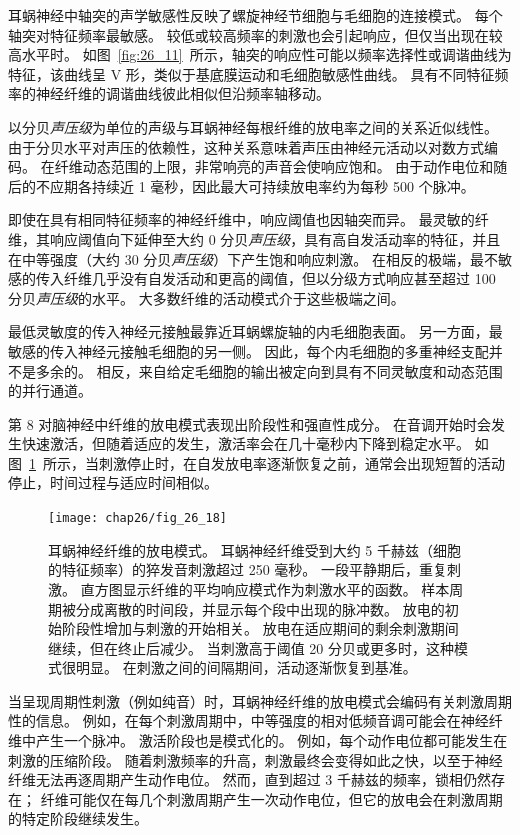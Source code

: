 耳蜗神经中轴突的声学敏感性反映了螺旋神经节细胞与毛细胞的连接模式。
每个轴突对特征频率最敏感。
较低或较高频率的刺激也会引起响应，但仅当出现在较高水平时。
如图~\ref{fig:26_11}~所示，轴突的响应性可能以频率选择性或调谐曲线为特征，该曲线呈 V 形，类似于基底膜运动和毛细胞敏感性曲线。
具有不同特征频率的神经纤维的调谐曲线彼此相似但沿频率轴移动。


以分贝\textit{声压级}为单位的声级与耳蜗神经每根纤维的放电率之间的关系近似线性。
由于分贝水平对声压的依赖性，这种关系意味着声压由神经元活动以对数方式编码。
在纤维动态范围的上限，非常响亮的声音会使响应饱和。
由于动作电位和随后的不应期各持续近 1 毫秒，因此最大可持续放电率约为每秒 500 个脉冲。


即使在具有相同特征频率的神经纤维中，响应阈值也因轴突而异。 
最灵敏的纤维，其响应阈值向下延伸至大约 0 分贝\textit{声压级}，具有高自发活动率的特征，并且在中等强度（大约 30 分贝\textit{声压级}）下产生饱和响应刺激。
在相反的极端，最不敏感的传入纤维几乎没有自发活动和更高的阈值，但以分级方式响应甚至超过 100 分贝\textit{声压级}的水平。
大多数纤维的活动模式介于这些极端之间。


最低灵敏度的传入神经元接触最靠近耳蜗螺旋轴的内毛细胞表面。
另一方面，最敏感的传入神经元接触毛细胞的另一侧。
因此，每个内毛细胞的多重神经支配并不是多余的。
相反，来自给定毛细胞的输出被定向到具有不同灵敏度和动态范围的并行通道。


第 8 对脑神经中纤维的放电模式表现出阶段性和强直性成分。
在音调开始时会发生快速激活，但随着适应的发生，激活率会在几十毫秒内下降到稳定水平。
如图~\ref{fig:26_18}~所示，当刺激停止时，在自发放电率逐渐恢复之前，通常会出现短暂的活动停止，时间过程与适应时间相似。


\begin{figure}[htbp]
	\centering
	\texttt{[image: chap26/fig\_26\_18]}
	\caption{耳蜗神经纤维的放电模式。
		耳蜗神经纤维受到大约 5 千赫兹（细胞的特征频率）的猝发音刺激超过 250 毫秒。
		一段平静期后，重复刺激。
		直方图显示纤维的平均响应模式作为刺激水平的函数。
		样本周期被分成离散的时间段，并显示每个段中出现的脉冲数。
		放电的初始阶段性增加与刺激的开始相关。
		放电在适应期间的剩余刺激期间继续，但在终止后减少。
		当刺激高于阈值 20 分贝或更多时，这种模式很明显。
		在刺激之间的间隔期间，活动逐渐恢复到基准\cite{kiang1965discharge}。}
	\label{fig:26_18}
\end{figure}


当呈现周期性刺激（例如纯音）时，耳蜗神经纤维的放电模式会编码有关刺激周期性的信息。
例如，在每个刺激周期中，中等强度的相对低频音调可能会在神经纤维中产生一个脉冲。
激活阶段也是模式化的。
例如，每个动作电位都可能发生在刺激的压缩阶段。
随着刺激频率的升高，刺激最终会变得如此之快，以至于神经纤维无法再逐周期产生动作电位。
然而，直到超过 3 千赫兹的频率，锁相仍然存在；
纤维可能仅在每几个刺激周期产生一次动作电位，但它的放电会在刺激周期的特定阶段继续发生。



